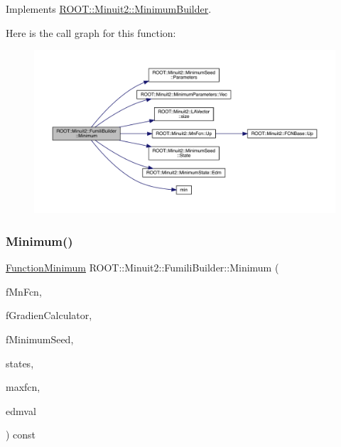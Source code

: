Implements \mbox{\hyperlink{classROOT_1_1Minuit2_1_1MinimumBuilder_aefaa624436afa8195af1f3393a35981f}{R\+O\+O\+T\+::\+Minuit2\+::\+Minimum\+Builder}}.

Here is the call graph for this function\+:\nopagebreak
\begin{figure}[H]
\begin{center}
\leavevmode
\includegraphics[width=350pt]{dc/dcb/classROOT_1_1Minuit2_1_1FumiliBuilder_a6e598ea8d57750ec860595ba494bb501_cgraph}
\end{center}
\end{figure}
\mbox{\label{classROOT_1_1Minuit2_1_1FumiliBuilder_ac0df0ebc275b75e6a6831f102f1753d2}} 
\subsubsection{\texorpdfstring{Minimum()}{Minimum()}\hspace{0.1cm}{\footnotesize\ttfamily [3/4]}}
{\footnotesize\ttfamily \mbox{\hyperlink{classROOT_1_1Minuit2_1_1FunctionMinimum}{Function\+Minimum}} R\+O\+O\+T\+::\+Minuit2\+::\+Fumili\+Builder\+::\+Minimum (\begin{DoxyParamCaption}\item[{const \mbox{\hyperlink{classROOT_1_1Minuit2_1_1MnFcn}{Mn\+Fcn}} \&}]{f\+Mn\+Fcn,  }\item[{const \mbox{\hyperlink{classROOT_1_1Minuit2_1_1GradientCalculator}{Gradient\+Calculator}} \&}]{f\+Gradien\+Calculator,  }\item[{const \mbox{\hyperlink{classROOT_1_1Minuit2_1_1MinimumSeed}{Minimum\+Seed}} \&}]{f\+Minimum\+Seed,  }\item[{std\+::vector$<$ \mbox{\hyperlink{classROOT_1_1Minuit2_1_1MinimumState}{Minimum\+State}} $>$ \&}]{states,  }\item[{unsigned int}]{maxfcn,  }\item[{double}]{edmval }\end{DoxyParamCaption}) const}

